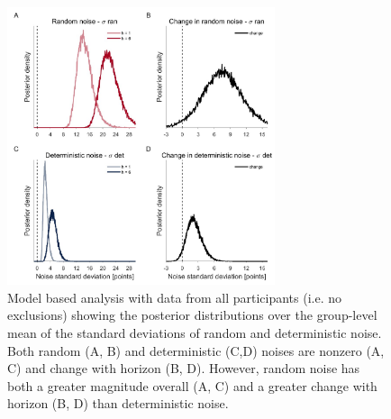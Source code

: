 \documentclass[12pt]{article}
\begin{document}
	\newpage
	\begin{figure}[H]
		\begin{center}
			\includegraphics[width=0.7\textwidth]{figures/RDBayes_hyperprior__all.jpg}
			\caption{Model based analysis with data from all participants (i.e. no exclusions) showing the posterior distributions over the group-level mean of the standard deviations of  random and deterministic noise. Both random (A, B) and deterministic (C,D) noises are nonzero (A, C) and change with horizon (B, D).  However, random noise has both a greater magnitude overall (A, C) and a greater change with horizon (B, D) than deterministic noise.}
			\label{fig:s8}
		\end{center}
	\end{figure}
	
\end{document}

